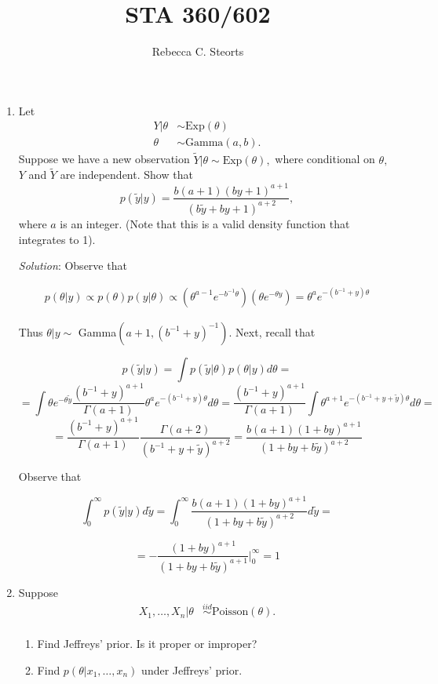 \documentclass[11pt]{article}
\begin{document}
\title{STA 360/602}
\author{Rebecca C. Steorts}
\maketitle
\setlength{\parindent}{0cm}
\thispagestyle{empty}
\begin{enumerate}

\item Let
\begin{align*}
Y|\theta &\sim \text{Exp}(\theta)\\
\theta &\sim \text{Gamma}(a,b).
\end{align*}
Suppose we have a new observation $\tilde{Y}|\theta \sim 
\text{Exp}(\theta),$ where conditional on $\theta,$ $Y$ and 
$\tilde{Y}$ are independent. Show that 
$$p(\tilde{y}|y) = \frac{b(a+1)(by+1)^{a+1}}{(b\tilde{y} + by + 1)^{a+2}},$$ where $a$ is an integer. (Note that this is a valid density function that integrates to 1).

\emph{Solution}: Observe that

\begin{align*}
	p(\theta|y) \propto	p(\theta)p(y|\theta) \propto \left(\theta^{a-1}e^{-b^{-1}\theta}\right) \left(\theta e^{-\theta y}\right) = \theta^{a}e^{-(b^{-1}+y)\theta}
\end{align*}

Thus $\theta|y \sim$ Gamma$(a+1,(b^{-1}+y)^{-1})$. Next, recall that

\[ p(\tilde{y}|y)	= \int{p(\tilde{y}|\theta)p(\theta|y)d\theta} = \]
\[ = \int{\theta e^{-\theta \tilde{y}} \frac{(b^{-1}+y)^{a+1}}{\Gamma(a+1)} \theta^{a} e^{-(b^{-1}+y)\theta} d\theta} = \frac{(b^{-1}+y)^{a+1}}{\Gamma(a+1)} \int{ \theta^{a+1} e^{-(b^{-1}+y+\tilde{y})\theta} d\theta} = \]
\[ = \frac{(b^{-1}+y)^{a+1}}{\Gamma(a+1)} \frac{\Gamma(a+2)}{(b^{-1}+y+\tilde{y})^{a+2}} = \frac{b(a+1)(1+by)^{a+1}}{(1+by+b\tilde{y})^{a+2}} \]

Observe that

\[ \int_{0}^{\infty}{p(\tilde{y}|y)d\tilde{y}} = \int_{0}^{\infty}{\frac{b(a+1)(1+by)^{a+1}}{(1+by+b\tilde{y})^{a+2}}d\tilde{y}} = \]

\[ = -\frac{(1+by)^{a+1}}{(1+by+b\tilde{y})^{a+1}} \bigg|_{0}^{\infty} = 1 \]

\item Suppose
\begin{align*}
X_1,\ldots,X_n|\theta &\stackrel{iid}{\sim} \text{Poisson}(\theta).\\
\end{align*}
\begin{enumerate}
\item Find Jeffreys' prior. Is it proper or improper? 
\item Find $p(\theta|x_1,\ldots,x_n)$ under Jeffreys' prior.
\end{enumerate}


\end{enumerate}
\end{document}

